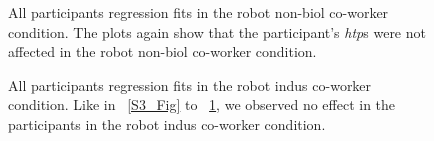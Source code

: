\begin{figure}
	\caption{All participants regression fits in the robot non-biol co-worker condition. The plots again show that the participant's {\it htp}s were not affected in the robot non-biol co-worker condition.}
\label{S5_Fig}
\end{figure}


\begin{figure}
	\caption{All participants regression fits in the robot indus co-worker condition. Like in ~\ref{S3_Fig} to ~\ref{S5_Fig}, we observed no effect in the participants in the robot indus co-worker condition.}
	\label{S6_Fig}
\end{figure}



\clearpage  %
